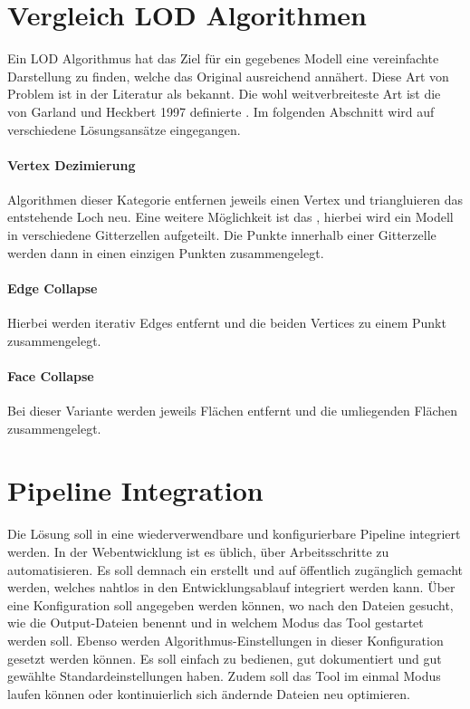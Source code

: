 \section{Vergleich LOD Algorithmen}
Ein LOD Algorithmus hat das Ziel für ein gegebenes Modell eine vereinfachte Darstellung zu finden, welche das Original ausreichend annähert.
Diese Art von Problem ist in der Literatur als  bekannt.
Die wohl weitverbreiteste Art ist die von Garland und Heckbert 1997 definierte .
\cite{surfaceSimplificationUsingQuadricErrorMetrices}
Im folgenden Abschnitt wird auf verschiedene Lösungsansätze eingegangen.

\paragraph{Vertex Dezimierung}
Algorithmen dieser Kategorie entfernen jeweils einen Vertex und triangluieren das entstehende Loch neu.
Eine weitere Möglichkeit ist das , hierbei wird ein Modell in verschiedene Gitterzellen aufgeteilt. Die Punkte innerhalb einer Gitterzelle werden dann in einen einzigen Punkten zusammengelegt.

\paragraph{Edge Collapse}
Hierbei werden iterativ Edges entfernt und die beiden Vertices zu einem Punkt zusammengelegt.

\paragraph{Face Collapse}
Bei dieser Variante werden jeweils Flächen entfernt und die umliegenden Flächen zusammengelegt.

\section{Pipeline Integration}
Die Lösung soll in eine wiederverwendbare und konfigurierbare Pipeline integriert werden.
In der Webentwicklung ist es üblich, über  Arbeitsschritte zu automatisieren. Es soll demnach ein  erstellt und auf  öffentlich zugänglich gemacht werden, welches nahtlos in den Entwicklungsablauf integriert werden kann. Über eine Konfiguration soll angegeben werden können, wo nach den  Dateien gesucht, wie die Output-Dateien benennt und in welchem Modus das Tool gestartet werden soll. Ebenso werden Algorithmus-Einstellungen in dieser Konfiguration gesetzt werden können. Es soll einfach zu bedienen, gut dokumentiert und gut gewählte Standardeinstellungen haben. Zudem soll das Tool im einmal Modus laufen können oder kontinuierlich sich ändernde Dateien neu optimieren.

